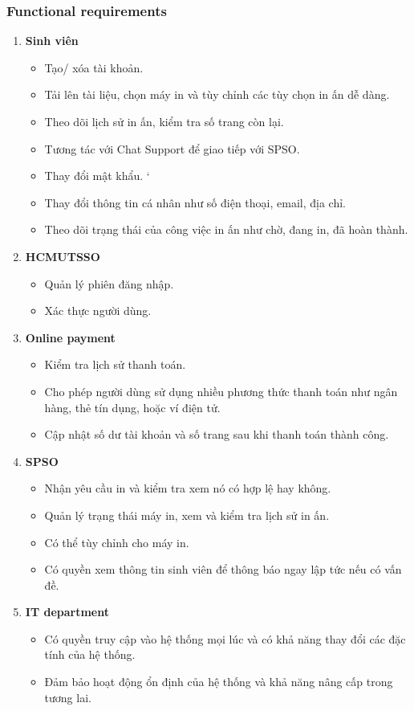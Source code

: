 \documentclass[a4paper]{article}
\begin{document}
\subsubsection{Functional requirements}
\begin{enumerate}
    \item {\textbf{Sinh viên}}
        \begin{itemize}
            \item Tạo/ xóa tài khoản.
            \item Tải lên tài liệu, chọn máy in và tùy chỉnh các tùy chọn in ấn dễ dàng.
            \item Theo dõi lịch sử in ấn, kiểm tra số trang còn lại.
            \item Tương tác với Chat Support để giao tiếp với SPSO.
            \item Thay đổi mật khẩu.
    `       \item Thay đổi thông tin cá nhân như số điện thoại, email, địa chỉ.
            \item Theo dõi trạng thái của công việc in ấn như chờ, đang in, đã hoàn thành.
        \end{itemize}
    \item {\textbf{HCMUT\textunderscore SSO}}
        \begin{itemize}
            \item Quản lý phiên đăng nhập.
            \item Xác thực người dùng.
        \end{itemize}
    \item {\textbf{Online payment}}
        \begin{itemize}
            \item Kiểm tra lịch sử thanh toán.
            \item Cho phép người dùng sử dụng nhiều phương thức thanh toán như ngân hàng, thẻ tín dụng, hoặc ví điện tử.
            \item Cập nhật số dư tài khoản và số trang sau khi thanh toán thành công.
        \end{itemize}
    \item {\textbf{SPSO}}
        \begin{itemize}
            \item Nhận yêu cầu in và kiểm tra xem nó có hợp lệ hay không.
            \item Quản lý trạng thái máy in, xem và kiểm tra lịch sử in ấn.
            \item Có thể tùy chỉnh cho máy in.
            \item Có quyền xem thông tin sinh viên để thông báo ngay lập tức nếu có vấn đề.
        \end{itemize}
    \item {\textbf{IT department}}
        \begin{itemize}
            \item Có quyền truy cập vào hệ thống mọi lúc và có khả năng thay đổi các đặc tính của hệ thống.
            \item Đảm bảo hoạt động ổn định của hệ thống và khả năng nâng cấp trong tương lai.
        \end{itemize}
\end{enumerate}
\end{document}
